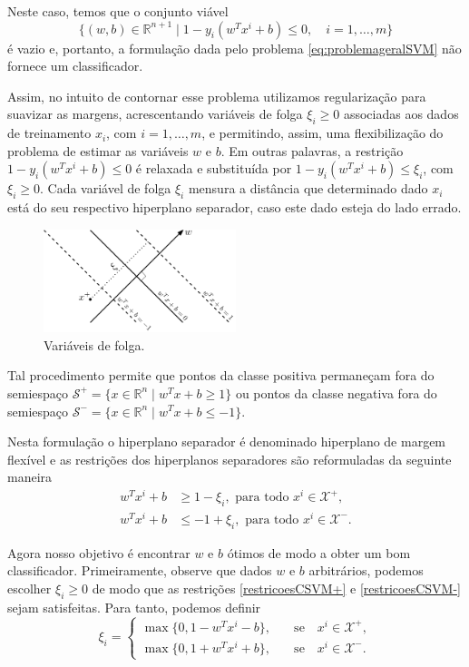 \documentclass[12pt,a4paper]{scrartcl}
\def\Xset{\mathcal{X}}
\def\RR{\mathds{R}}
\theoremstyle{definition}%
\begin{document}
Neste caso, temos que o conjunto viável
\[
\{ (w,b) \in \RR^{n+1} \mid 1-y_{i}(w^{T}x^{i} + b) \leq 0 , \quad i=1, \ldots , m \}
\]
é vazio e, portanto, a formulação dada pelo problema \eqref{eq:problemageralSVM} não fornece um classificador.

Assim, no intuito de contornar esse problema utilizamos regularização para suavizar as margens, acrescentando variáveis de folga $\xi_{i} \geq 0$ associadas aos dados de treinamento $x_{i}$, com $i=1, \ldots , m$, e permitindo, assim, uma flexibilização do problema de estimar as variáveis $w$ e $b$. Em outras palavras, a restrição $1-y_{i}(w^{T}x^{i} + b) \leq 0$ é relaxada e substituída por $1-y_{i}(w^{T}x^{i} + b) \leq \xi_{i} $, com $\xi_{i} \geq 0$. Cada variável de folga $\xi_{i}$ mensura a distância que determinado dado $x_{i}$ está do seu respectivo hiperplano separador, caso este dado esteja do lado errado.

\begin{figure}[!ht] 
	\centering
	\includegraphics[width=0.50\textwidth]{variaveis_de_folga}
	\caption{Variáveis de folga. \label{fig:variaveis_de_folga}}
\end{figure}

Tal procedimento permite que pontos da classe positiva permaneçam fora do semiespaço $\mathcal{S}^{+}=\{x\in \RR^n \mid w^{T}x+b\geq 1\}$ ou pontos da classe negativa fora do semiespaço $\mathcal{S}^{-}=\{x\in \RR^n \mid w^{T}x+b\leq -1\}$. 

Nesta formulação o hiperplano separador é denominado hiperplano de margem flexível e as restrições dos hiperplanos separadores são reformuladas da seguinte maneira 
\begin{align}
w^{T}x^{i}+b &\geq 1 - \xi_{i} , \text{ para  todo } x^{i} \in \Xset^{+}, \label{restricoesCSVM+} \\
w^{T}x^{i}+b &\leq -1 +\xi_{i} , \text{ para  todo } x^{i} \in \Xset^{-}. \label{restricoesCSVM-}
\end{align}


Agora nosso objetivo é encontrar $w$ e $b$ ótimos de modo a obter um bom classificador. Primeiramente, observe que dados $w$ e $b$ arbitrários, podemos escolher $\xi_{i} \geq 0$ de modo que as restrições \eqref{restricoesCSVM+} e \eqref{restricoesCSVM-} sejam satisfeitas. Para tanto, podemos definir
\[
\xi_{i} =  \left \{ \begin{array}{cc} \max\{0, 1-w^{T}x^{i}-b\}, & \quad \text{se} \quad x^{i} \in \Xset^{+}, \\
\max\{0, 1+w^{T}x^{i}+b\}, & \quad \text{se} \quad x^{i} \in \Xset^{-}.
\end{array} \right .
\]
 
\end{document}
